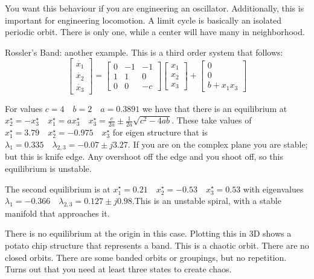\documentclass[11pt]{article}
\begin{document}
You want this behaviour if you are engineering an oscillator. Additionally, this is important for engineering locomotion. A limit cycle is basically an isolated periodic orbit. There is only one, while a center will have many in neighborhood.

Rossler's Band: another example. This is a third order system that follows:
\begin{equation}
\begin{bmatrix}
\dot{x_1} \\
\dot{x_2} \\
\dot{x_3}
\end{bmatrix}
=
\begin{bmatrix}
0 & -1 & -1\\
1 & 1 & 0 \\
0 & 0 & -c
\end{bmatrix}
\begin{bmatrix}
{x_1} \\
{x_2} \\
x_3
\end{bmatrix}
+
\begin{bmatrix}
0 \\ 0\\ b+x_1x_3
\end{bmatrix}
\end{equation}

For values $c=4 \quad b=2 \quad a =0.3891$ we have that there is an equilibrium at $x_2^\star = -x_3^\star \quad x_1^\star = ax_3^\star \quad x_3^\star = \frac{c}{2a} \pm \frac{1}{2a}\sqrt{c^2-4ab}$. These take values of $x_1^\star=3.79 \quad x_2^\star= -0.975 \quad x_3^\star$ for eigen structure that is $\lambda_1 = 0.335 \quad \lambda_{2,3}=-0.07\pm j3.27$. If you are on the complex plane you are stable; but this is knife edge. Any overshoot off the edge and you shoot off, so this equilibrium is unstable.

The second equilibrium is at $x_1^\star = 0.21 \quad x_2^\star = -0.53 \quad x_3^\star=0.53$ with eigenvalues $\lambda_1 = -0.366 \quad \lambda_{2,3}=0.127\pm j0.98$.This is an unstable spiral, with a stable manifold that approaches it.

There is no equilibrium at the origin in this case. Plotting this in 3D shows a potato chip structure that represents a band. This is a chaotic orbit. There are no closed orbits. There are some banded orbits or groupings, but no repetition. Turns out that you need at least three states to create chaos.
\end{document}
